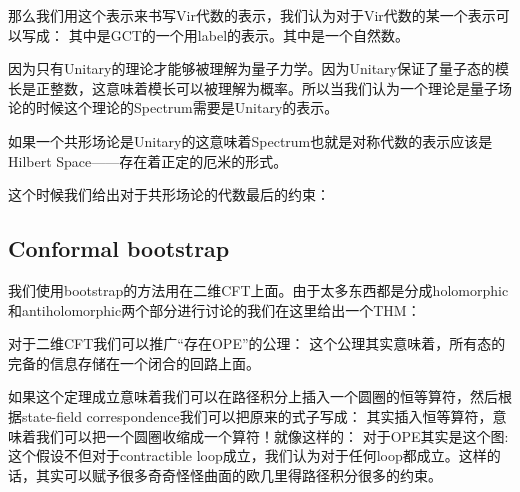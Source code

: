 那么我们用这个表示来书写Vir代数的表示，我们认为对于Vir代数的某一个表示\seq{\mR}可以写成：
其中是GCT的一个用label的表示。其中是一个自然数。


因为只有Unitary的理论才能够被理解为量子力学。因为Unitary保证了量子态的模长是正整数，这意味着模长可以被理解为概率。所以当我们认为一个理论是量子场论的时候这个理论的Spectrum需要是Unitary的表示。

如果一个共形场论是Unitary的这意味着Spectrum也就是对称代数的表示应该是Hilbert Space——存在着正定的厄米的形式。

这个时候我们给出对于共形场论的代数最后的约束：

\subsection{Conformal bootstrap}
我们使用bootstrap的方法用在二维CFT上面。由于太多东西都是分成holomorphic和antiholomorphic两个部分进行讨论的我们在这里给出一个THM：

对于二维CFT我们可以推广“存在OPE”的公理：
这个公理其实意味着，所有态的完备的信息存储在一个闭合的回路上面。

如果这个定理成立意味着我们可以在路径积分上插入一个圆圈的恒等算符，然后根据state-field correspondence我们可以把原来的式子写成：
其实插入恒等算符，意味着我们可以把一个圆圈收缩成一个算符！就像这样的：
对于OPE其实是这个图:
这个假设不但对于contractible loop成立，我们认为对于任何loop都成立。这样的话，其实可以赋予很多奇奇怪怪曲面的欧几里得路径积分很多的约束。

